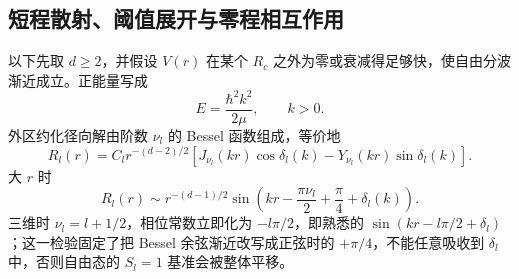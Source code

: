 

\subsection{短程散射、阈值展开与零程相互作用}
\label{sec:phys-hdqm-threshold-scattering}

以下先取 $d\ge2$，并假设 $V(r)$ 在某个 $R_c$ 之外为零或衰减得足够快，使自由分波渐近成立。正能量写成
\[
E=\frac{\hbar^2k^2}{2\mu},\qquad k>0.
\]
外区约化径向解由阶数 $\nu_l$ 的 Bessel 函数组成，等价地
\begin{equation}
R_l(r)=C_l r^{-(d-2)/2}
\left[J_{\nu_l}(kr)\cos\delta_l(k)-Y_{\nu_l}(kr)\sin\delta_l(k)\right].
\label{eq:phys-hdqm-scattering-bessel-combination}
\end{equation}
大 $r$ 时
\begin{equation}
R_l(r)\sim r^{-(d-1)/2}
\sin\left(kr-\frac{\pi\nu_l}{2}+\frac\pi4+\delta_l(k)\right).
\label{eq:phys-hdqm-phase-asymptotic}
\end{equation}
三维时 $\nu_l=l+1/2$，相位常数立即化为 $-l\pi/2$，即熟悉的 $\sin(kr-l\pi/2+\delta_l)$；这一检验固定了把 Bessel 余弦渐近改写成正弦时的 $+\pi/4$，不能任意吸收到 $\delta_l$ 中，否则自由态的 $S_l=1$ 基准会被整体平移。

